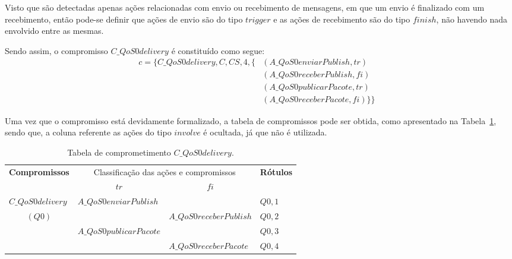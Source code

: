 Visto que são detectadas apenas ações relacionadas com envio ou recebimento de mensagens, em que um envio é finalizado com um recebimento, então pode-se definir que ações de envio são do tipo $trigger$ e as ações de recebimento são do tipo $finish$, não havendo nada envolvido entre as mesmas.

Sendo assim, o compromisso $C\_QoS0delivery$ é constituído como segue:
\begin{eqnarray}
c = \{C\_QoS0delivery,C,CS,4, \{ &(A\_QoS0enviarPublish,tr)&  \nonumber \\
&(A\_QoS0receberPublish,fi)&  \nonumber \\
&(A\_QoS0publicarPacote,tr)&  \nonumber \\
&(A\_QoS0receberPacote,fi) \}\}& 
\end{eqnarray}

Uma vez que o compromisso está devidamente formalizado, a tabela de compromissos pode ser obtida, como apresentado na Tabela~\ref{tab:qos0}, sendo que, a coluna referente as ações do tipo $involve$ é ocultada, já que não é utilizada. 

\begin{table}[!ht]
	\centering\tiny{
		\caption{Tabela de comprometimento $C\_QoS0delivery$. \label{tab:qos0}}
\begin{tabular}{|l|l|l|l|}
	\hline
	\multicolumn{1}{|c|}{\multirow{2}{*}{\textbf{Compromissos}}} & \multicolumn{2}{c|}{Classificação das ações e compromissos} & \multicolumn{1}{c|}{\multirow{2}{*}{\textbf{Rótulos}}} \\ \cline{2-3}
	\multicolumn{1}{|c|}{}                                       & \multicolumn{1}{c|}{$tr$}    & \multicolumn{1}{c|}{$fi$}    & \multicolumn{1}{c|}{}                                  \\ \hline
	$C\_QoS0delivery$                                            & $A\_QoS0enviarPublish$       &                              & $Q0,1$                                                 \\ \cline{2-4} 
	\multicolumn{1}{|c|}{$(Q0)$}                                 &                              & $A\_QoS0receberPublish$      & $Q0,2$                                                 \\ \cline{2-4} 
	& $A\_QoS0publicarPacote$      &                              & $Q0,3$                                                 \\ \cline{2-4} 
	&                              & $A\_QoS0receberPacote$       & $Q0,4$                                                 \\ \hline
\end{tabular}
	}
\end{table}

